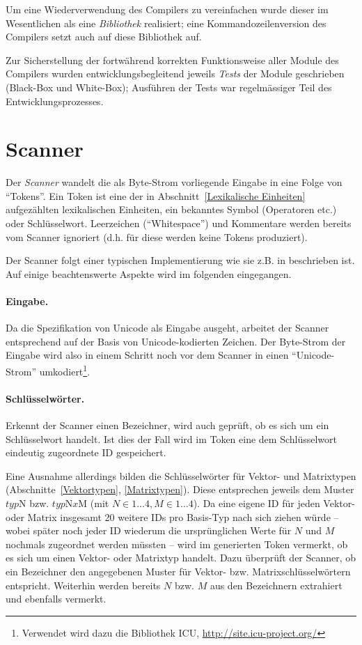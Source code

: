\documentclass[twoside,a4paper,fleqn,12pt]{book}
\begin{document}
Um eine Wiederverwendung des Compilers zu vereinfachen wurde dieser im Wesentlichen als eine \emph{Bibliothek} realisiert;
eine Kommandozeilenversion des Compilers setzt auch auf diese Bibliothek auf.
 
Zur Sicherstellung der fortwährend korrekten Funktionsweise aller Module des Compilers wurden entwicklungsbegleitend 
jeweils \emph{Tests} der Module geschrieben (Black-Box und White-Box); Ausführen der Tests war regelmässiger Teil des Entwicklungsprozesses.
 
\section{Scanner}

Der \emph{Scanner} wandelt die als Byte-Strom vorliegende Eingabe in eine Folge von "`Tokens"'.
Ein Token ist eine der in Abschnitt~\ref{Lexikalische Einheiten} aufgezählten lexikalischen Einheiten, ein bekanntes Symbol (Operatoren etc.) oder Schlüsselwort. 
Leerzeichen (``Whitespace'') und Kommentare werden bereits vom Scanner ignoriert (d.h. für diese werden keine Tokens produziert).

Der Scanner folgt einer typischen Implementierung wie sie z.B. in \cite{wirth_compiler} beschrieben ist. Auf einige beachtenswerte Aspekte
wird im folgenden eingegangen.

\paragraph{Eingabe.} Da die Spezifikation von Unicode als Eingabe ausgeht, arbeitet der Scanner entsprechend auf der Basis von Unicode-kodierten Zeichen.
Der Byte-Strom der Eingabe wird also in einem Schritt noch vor dem Scanner in einen "`Unicode-Strom"' umkodiert\footnote{Verwendet wird dazu die Bibliothek ICU,
\url{http://site.icu-project.org/}}.

\paragraph{Schlüsselwörter.} Erkennt der Scanner einen Bezeichner, wird auch geprüft, ob es sich um ein Schlüsselwort handelt. Ist dies der Fall
wird im Token eine dem Schlüsselwort eindeutig zugeordnete ID gespeichert.

Eine Ausnahme allerdings bilden die Schlüsselwörter für Vektor- und Matrixtypen (Abschnitte~\ref{Vektortypen}, \ref{Matrixtypen}). Diese entsprechen
jeweils dem Muster $\mathit{typ}\mathrm{N}$ bzw. $\mathit{typ}\mathrm{N}\mathit{x}\mathrm{M}$ (mit $N \in 1 \dots 4, M \in 1 \dots 4$).
Da eine eigene ID für jeden Vektor- oder Matrix insgesamt 20 weitere IDs pro Basis-Typ nach sich ziehen würde -- wobei später noch jeder ID wiederum
die ursprünglichen Werte für $N$ und $M$ nochmals zugeordnet
werden müssten -- wird im generierten Token vermerkt, ob es sich um einen Vektor- oder Matrixtyp handelt.
Dazu überprüft der Scanner, ob ein Bezeichner den angegebenen Muster für Vektor- bzw. Matrixschlüsselwörtern entspricht.
Weiterhin werden bereits $N$ bzw. $M$ aus den Bezeichnern extrahiert und ebenfalls vermerkt.
\end{document}
